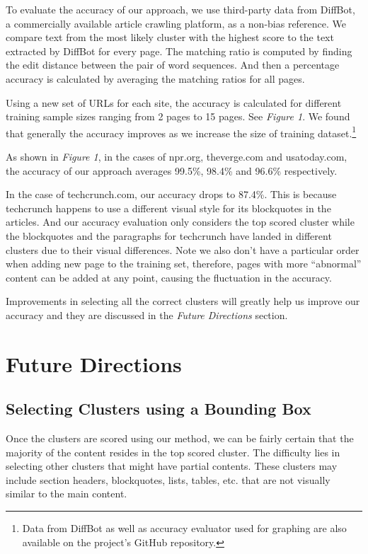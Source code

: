 \documentclass{acm_proc_article-sp}
\begin{document}
To evaluate the accuracy of our approach, we use third-party data from DiffBot\cite{diffbot}, a commercially available article crawling platform, as a non-bias reference. We compare text from the most likely cluster with the highest score to the text extracted by DiffBot for every page. The matching ratio is computed by finding the edit distance between the pair of word sequences. And then a percentage accuracy is calculated by averaging the matching ratios for all pages.

Using a new set of URLs for each site, the accuracy is calculated for different training sample sizes ranging from 2 pages to 15 pages. See \emph{Figure 1}. We found that generally the accuracy improves as we increase the size of training dataset.\footnote{Data from DiffBot as well as accuracy evaluator used for graphing are also available on the project's GitHub repository.}

As shown in \emph{Figure 1}, in the cases of npr.org, theverge.com and usatoday.com, the accuracy of our approach averages 99.5\%, 98.4\% and 96.6\% respectively.

In the case of techcrunch.com, our accuracy drops to 87.4\%. This is because techcrunch happens to use a different visual style for its blockquotes in the articles. And our accuracy evaluation only considers the top scored cluster while the blockquotes and the paragraphs for techcrunch have landed in different clusters due to their visual differences. Note we also don't have a particular order when adding new page to the training set, therefore, pages with more ``abnormal'' content can be added at any point, causing the fluctuation in the accuracy.

Improvements in selecting all the correct clusters will greatly help us improve our accuracy and they are discussed in the \emph{Future Directions} section.

\section{Future Directions}

\subsection{Selecting Clusters using a Bounding Box}

Once the clusters are scored using our method, we can be fairly certain that the majority of the content resides in the top scored cluster. The difficulty lies in selecting other clusters that might have partial contents. These clusters may include section headers, blockquotes, lists, tables, etc. that are not visually similar to the main content.
\end{document}
